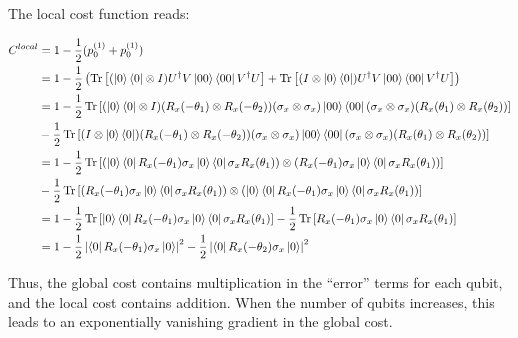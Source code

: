 \documentclass[a4paper,12pt]{article}
\DeclareMathOperator{\tr}{Tr}
\begin{document}
The local cost function reads:

\begin{align*}
    C^{local} &= 1 - \frac{1}{2}(p_0^{(1)} + p_0^{(1)}) \\
    &= 1-\frac{1}{2}\left( \tr\left[ (\ket{0}\bra{0} \otimes I) U^\dagger V \ket{00}\bra{00} V^\dagger U \right] + \tr\left[ (I \otimes \ket{0}\bra{0}) U^\dagger V \ket{00}\bra{00} V^\dagger U  \right] \right) \\
    &= 1 - \frac{1}{2}\tr \left[ (\ket{0}\bra{0} \otimes I) (R_x(-\theta_1) \otimes R_x(-\theta_2)) (\sigma_x \otimes \sigma_x) \ket{00} \bra{00} (\sigma_x \otimes \sigma_x) (R_x(\theta_1) \otimes R_x(\theta_2)) \right] \\
    &- \frac{1}{2}\tr \left[ (I \otimes \ket{0}\bra{0}) (R_x(-\theta_1) \otimes R_x(-\theta_2)) (\sigma_x \otimes \sigma_x) \ket{00} \bra{00} (\sigma_x \otimes \sigma_x) (R_x(\theta_1) \otimes R_x(\theta_2)) \right] \\
    &= 1 - \frac{1}{2}\tr \left[ \left(\ket{0}\bra{0} R_x(-\theta_1) \sigma_x \ket{0} \bra{0} \sigma_x R_x(\theta_1) \right) \otimes \left( R_x(-\theta_1) \sigma_x \ket{0} \bra{0} \sigma_x R_x(\theta_1)\right) \right] \\
    &- \frac{1}{2}\tr \left[ \left(R_x(-\theta_1) \sigma_x \ket{0} \bra{0} \sigma_x R_x(\theta_1) \right) \otimes \left(\ket{0}\bra{0} R_x(-\theta_1) \sigma_x \ket{0} \bra{0} \sigma_x R_x(\theta_1)\right) \right] \\
    &= 1 - \frac{1}{2}\tr \left[\ket{0}\bra{0} R_x(-\theta_1) \sigma_x \ket{0} \bra{0} \sigma_x R_x(\theta_1) \right] - \frac{1}{2}\tr \left[ R_x(-\theta_1) \sigma_x \ket{0} \bra{0} \sigma_x R_x(\theta_1) \right] \\
    &= 1 - \frac{1}{2} \left| \bra{0} R_x(-\theta_1) \sigma_x \ket{0} \right|^2 - \frac{1}{2} \left| \bra{0} R_x(-\theta_2) \sigma_x \ket{0} \right|^2
\end{align*}


Thus, the global cost contains multiplication in the ``error'' terms for each qubit, and the local cost contains addition.
When the number of qubits increases, this leads to an exponentially vanishing gradient in the global cost.
\end{document}
